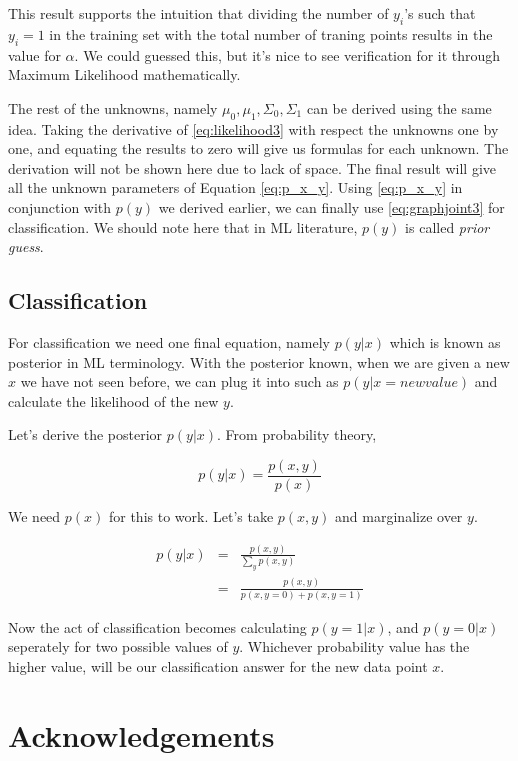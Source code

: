 \documentclass{ecctd01} %
\begin{document}
This result supports the intuition that dividing the number of $y_{i}$'s
such that $y_{i}=1$ in the training set with the total number of
traning points results in the value for $\alpha$. We could guessed this,
but it's nice to see verification for it through Maximum Likelihood
mathematically.  

The rest of the unknowns, namely $\mu_{0}, \mu_{1}, \Sigma_{0},
\Sigma_{1}$ can be derived using the same idea. Taking the derivative
of \eqref{eq:likelihood3} with respect the unknowns one by one, and 
equating the results to zero will give us formulas for each
unknown. The derivation will not be shown here due to lack of
space. The final result will give all the unknown parameters of
Equation \eqref{eq:p_x_y}. Using \eqref{eq:p_x_y} in conjunction with
$p(y)$ we derived earlier, we can finally use \eqref{eq:graphjoint3}
for classification. We should note here that in ML literature, $p(y)$
is called {\em prior guess}.

\subsection{Classification}

For classification we need one final equation, namely $p(y|x)$ which
is known as posterior in ML terminology. With the posterior known, when
we are given a new $x$ we have not seen before, we can plug it into
such as $p(y|x=new value)$ and calculate the likelihood of the new $y$. 

Let's derive the posterior $p(y|x)$. From probability theory,

\begin{equation}
  p(y|x) = \frac{p(x,y)}{p(x)} 
\end{equation}

We need $p(x)$ for this to work. Let's take $p(x,y)$ and marginalize
over $y$. 

\begin{eqnarray}
  p(y|x) &=& \frac{p(x,y)}{\sum_{y}p(x,y)}  \\
  &=& \frac{p(x,y)}{p(x,y=0) + p(x,y=1)}
\end{eqnarray}

Now the act of classification becomes calculating $p(y=1|x)$, and
$p(y=0|x)$ seperately for two possible values of $y$. Whichever
probability value has the higher value, will be our classification
answer for the new data point $x$. 

\section{Acknowledgements}
\end{document}

